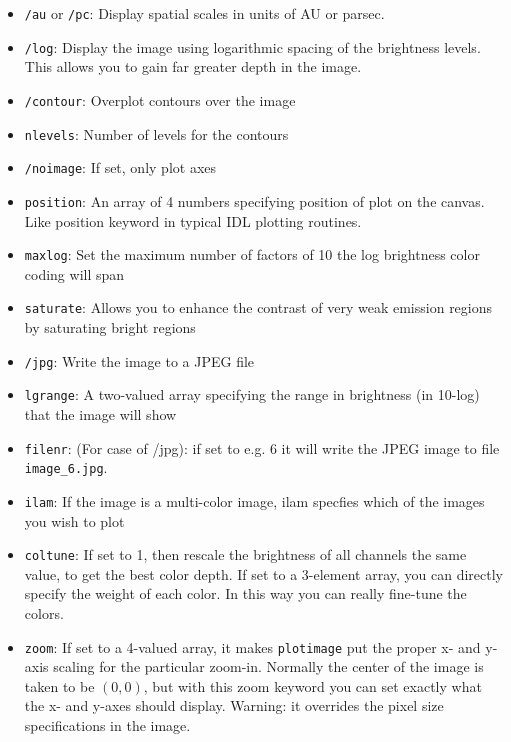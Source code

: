 \documentclass{report}
\begin{document}
\begin{itemize}
\item[] {\small\tt /au} or {\small\tt /pc}: Display spatial scales in units of AU or parsec.
\item[] {\small\tt /log}: Display the image using logarithmic spacing of the
  brightness levels. This allows you to gain far greater depth in the image.
\item[] {\small\tt /contour}: Overplot contours over the image
\item[] {\small\tt nlevels}: Number of levels for the contours
\item[] {\small\tt /noimage}: If set, only plot axes
\item[] {\small\tt position}: An array of 4 numbers specifying position of plot on
  the canvas. Like position keyword in typical IDL plotting routines.
\item[] {\small\tt maxlog}: Set the maximum number of factors of 10 the log
  brightness color coding will span
\item[] {\small\tt saturate}: Allows you to enhance the contrast of very weak
 emission regions by saturating bright regions
\item[] {\small\tt /jpg}: Write the image to a JPEG file
\item[] {\small\tt lgrange}: A two-valued array specifying the range in brightness 
  (in 10-log) that the image will show
\item[] {\small\tt filenr}: (For case of /jpg): if set to e.g. 6 it will write the
  JPEG image to file {\small\tt image\_6.jpg}. 
\item[] {\small\tt ilam}: If the image is a multi-color image, ilam specfies
  which of the images you wish to plot
\item[] {\small\tt coltune}: If set to 1, then rescale the brightness of all
  channels the same value, to get the best color depth. If set to a
  3-element array, you can directly specify the weight of each color.  In
  this way you can really fine-tune the colors.
\item[] {\small\tt zoom}: If set to a 4-valued array, it makes {\small\tt plotimage} put
  the proper x- and y- axis scaling for the particular zoom-in. Normally the
  center of the image is taken to be $(0,0)$, but with this zoom keyword you
  can set exactly what the x- and y-axes should display. Warning: it
  overrides the pixel size specifications in the image. 
\end{itemize}
\end{document}
